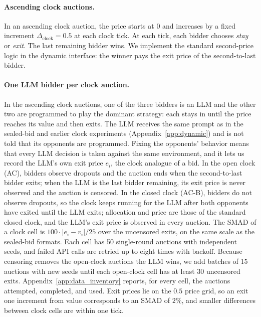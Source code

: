 \documentclass[acmsmall,screen,review]{acmart}
\newenvironment{revblock}{\color{blue}}{}
\newenvironment{revblock}{}{}
\begin{document}
\paragraph{Ascending clock auctions.}
In an ascending clock auction, the price starts at 0 and increases by a fixed increment $\Delta_{\text{clock}}=0.5$ at each clock tick. At each tick, each bidder chooses \emph{stay} or \emph{exit}. The last remaining bidder wins. We implement the standard second-price logic in the dynamic interface: the winner pays the exit price of the second-to-last bidder.

\begin{revblock}
\paragraph{One LLM bidder per clock auction.}\label{sec:one_llm_clock}
In the ascending clock auctions, one of the three bidders is an LLM and the other two are programmed to play the dominant strategy: each stays in until the price reaches its value and then exits. The LLM receives the same prompt as in the sealed-bid and earlier clock experiments (Appendix~\ref{app:dynamic}) and is not told that its opponents are programmed. Fixing the opponents' behavior means that every LLM decision is taken against the same environment, and it lets us record the LLM's own exit price $e_i$, the clock analogue of a bid. In the open clock (AC), bidders observe dropouts and the auction ends when the second-to-last bidder exits; when the LLM is the last bidder remaining, its exit price is never observed and the auction is censored. In the closed clock (AC-B), bidders do not observe dropouts, so the clock keeps running for the LLM after both opponents have exited until the LLM exits; allocation and price are those of the standard closed clock, and the LLM's exit price is observed in every auction. The SMAD of a clock cell is $100\cdot\overline{|e_i-v_i|}/25$ over the uncensored exits, on the same scale as the sealed-bid formats. Each cell has 50 single-round auctions with independent seeds, and failed API calls are retried up to eight times with backoff. Because censoring removes the open-clock auctions the LLM wins, we add batches of 15 auctions with new seeds until each open-clock cell has at least 30 uncensored exits. Appendix~\ref{app:data_inventory} reports, for every cell, the auctions attempted, completed, and used. Exit prices lie on the $0.5$ price grid, so an exit one increment from value corresponds to an SMAD of $2\%$, and smaller differences between clock cells are within one tick.
\end{revblock}
\end{document}
